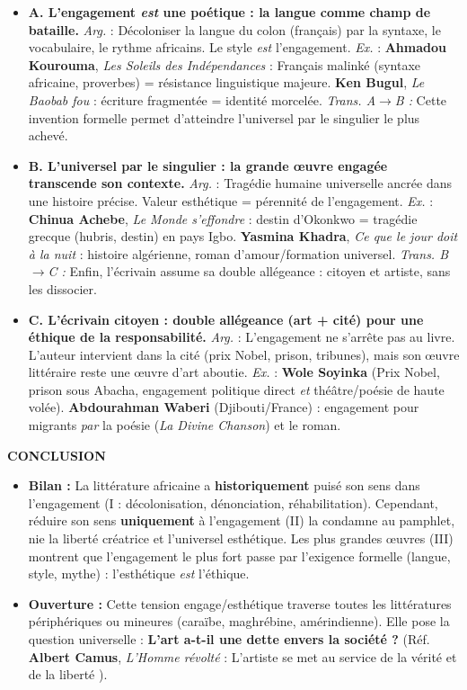 \documentclass[11pt]{article}
\begin{document}
\begin{exoresolu}
\begin{itemize}
    \item \textbf{A. L'engagement \emph{est} une poétique : la langue comme champ de bataille.}
    \textit{Arg.} : Décoloniser la langue du colon (français) par la syntaxe, le vocabulaire, le rythme africains. Le style \emph{est} l'engagement.
    \textit{Ex.} : \textbf{Ahmadou Kourouma}, \emph{Les Soleils des Indépendances} : \og Français malinké \fg (syntaxe africaine, proverbes) = résistance linguistique majeure. \textbf{Ken Bugul}, \emph{Le Baobab fou} : écriture fragmentée = identité morcelée.
    \textit{Trans. A$\to$B :} \og Cette invention formelle permet d'atteindre l'universel par le singulier le plus achevé. \fg
    \item \textbf{B. L'universel par le singulier : la grande œuvre engagée transcende son contexte.}
    \textit{Arg.} : Tragédie humaine universelle ancrée dans une histoire précise. Valeur esthétique = pérennité de l'engagement.
    \textit{Ex.} : \textbf{Chinua Achebe}, \emph{Le Monde s'effondre} : destin d'Okonkwo = tragédie grecque (hubris, destin) en pays Igbo. \textbf{Yasmina Khadra}, \emph{Ce que le jour doit à la nuit} : histoire algérienne, roman d'amour/formation universel.
    \textit{Trans. B$\to$C :} \og Enfin, l'écrivain assume sa double allégeance : citoyen et artiste, sans les dissocier. \fg
    \item \textbf{C. L'écrivain citoyen : double allégeance (art + cité) pour une éthique de la responsabilité.}
    \textit{Arg.} : L'engagement ne s'arrête pas au livre. L'auteur intervient dans la cité (prix Nobel, prison, tribunes), mais son œuvre littéraire reste une œuvre d'art aboutie.
    \textit{Ex.} : \textbf{Wole Soyinka} (Prix Nobel, prison sous Abacha, engagement politique direct \emph{et} théâtre/poésie de haute volée). \textbf{Abdourahman Waberi} (Djibouti/France) : engagement pour migrants \emph{par} la poésie (\emph{La Divine Chanson}) et le roman.
\end{itemize}

\textbf{CONCLUSION}
\begin{itemize}
    \item \textbf{Bilan :} La littérature africaine a \textbf{historiquement} puisé son sens dans l'engagement (I : décolonisation, dénonciation, réhabilitation). Cependant, réduire son sens \textbf{uniquement} à l'engagement (II) la condamne au pamphlet, nie la liberté créatrice et l'universel esthétique. Les plus grandes œuvres (III) montrent que l'engagement le plus fort passe par l'exigence formelle (langue, style, mythe) : l'esthétique \emph{est} l'éthique.
    \item \textbf{Ouverture :} Cette tension engage/esthétique traverse toutes les littératures \og périphériques \fg ou \og mineures \fg (caraïbe, maghrébine, amérindienne). Elle pose la question universelle : \textbf{L'art a-t-il une dette envers la société ?} (Réf. \textbf{Albert Camus}, \emph{L'Homme révolté} : \og L'artiste se met au service de la vérité et de la liberté \fg).
\end{itemize}
\end{exoresolu}
\end{document}
